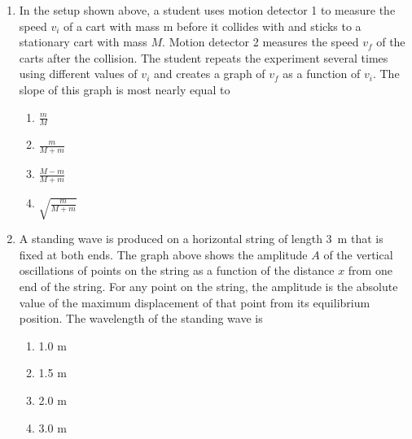 \documentclass[11pt]{article}
\newcommand{\pic}[2]{\texttt{[image: \#2]}}
\begin{document}
\begin{multicols}{2}
\begin{enumerate}[leftmargin=18pt,resume]
    \begin{center}
      \pic{.47}{car-collision}
    \end{center}
  \item\vspace{-.15in}In the setup shown above, a student uses motion detector
    1 to measure
    the speed $v_i$ of a cart with mass m before it collides with and sticks to
    a stationary cart with mass $M$. Motion detector 2 measures the speed $v_f$
    of the carts after the collision. The student repeats the experiment
    several times using different values of $v_i$ and creates a graph of $v_f$
    as a function of $v_i$. The slope of this graph is most nearly equal to
    \begin{enumerate}[nosep,leftmargin=18pt,label=(\Alph*)]
    \item$\displaystyle\frac{m}{M}$
    \item$\displaystyle\frac{m}{M+m}$
    \item$\displaystyle\frac{M-m}{M+m}$
    \item$\displaystyle\sqrt{\frac{m}{M+m}}$
    \end{enumerate}
    
    \begin{center}
    \end{center}
  \item\vspace{-.18in}A standing wave is produced on a horizontal string of
    length \SI{3}{\metre} that is fixed at both ends. The graph above shows the
    amplitude $A$ of the vertical oscillations of points on the string as a
    function of the distance
    $x$ from one end of the string. For any point on the string, the amplitude
    is the absolute value of the maximum displacement of that point from its
    equilibrium position. The wavelength of the standing wave is
    \begin{enumerate}[nosep,leftmargin=18pt,label=(\Alph*)]
    \item 1.0 m
    \item 1.5 m
    \item 2.0 m
    \item 3.0 m
    \end{enumerate}
 

\end{enumerate}
\end{multicols}
\end{document}
